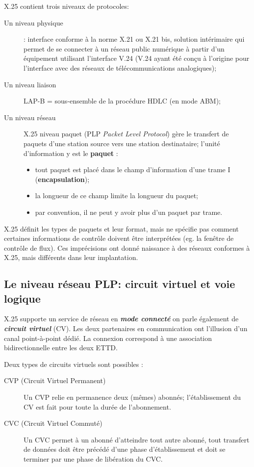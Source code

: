 \documentclass[11pt,english,french]{scrreprt}
\theoremstyle{remark}
\theoremstyle{definition}
\begin{document}
X.25 contient trois niveaux de protocoles:
\begin{description}
	\item[Un niveau physique]: interface conforme à la norme X.21 ou X.21 bis, solution intérimaire qui permet de se connecter à un réseau public numérique à partir d'un équipement utilisant l'interface V.24 (V.24 ayant été conçu à l'origine pour l'interface avec des réseaux de télécommunications analogiques);
	\item[Un niveau liaison]LAP-B = sous-ensemble de la procédure HDLC (en mode ABM);
	\item[Un niveau réseau]X.25 niveau paquet (PLP \emph{Packet Level Protocol}) gère le transfert de paquets d'une station source vers une station destinataire; l'unité d'information y est le \textbf{paquet} :
	\begin{itemize}
		\item tout paquet est placé dans le champ d'information d'une trame I (\textbf{encapsulation});
		\item la longueur de ce champ limite la longueur du paquet;
		\item par convention, il ne peut y avoir plus d'un paquet par trame.
	\end{itemize}
\end{description} 

X.25 définit les types de paquets et leur format, mais ne spécifie pas comment certaines informations de contrôle doivent être interprétées (eg. la fenêtre de contrôle de flux). Ces imprécisions ont donné naissance à des réseaux conformes à X.25, mais différents dans leur implantation.

\subsection{Le niveau réseau PLP: circuit virtuel et voie logique}

X.25 supporte un service de réseau en \textbf{\emph{mode connecté}} on parle également de \textbf{\emph{circuit virtuel}} (CV). Les deux partenaires en communication ont l'illusion d'un canal point-à-point dédié. La connexion correspond à une association bidirectionnelle entre les deux ETTD. 

Deux types de circuits virtuels sont possibles : 
\begin{description}
	\item[CVP (Circuit Virtuel Permanent)] Un CVP relie en permanence deux (mêmes) abonnés; l'établissement du CV est fait pour toute la durée de l'abonnement.
	\item[CVC (Circuit Virtuel Commuté)] Un CVC permet à un abonné d'atteindre tout autre abonné, tout transfert de données doit être précédé d'une phase d'établissement et doit se terminer par une phase de libération du CVC.
\end{description}
\end{document}
